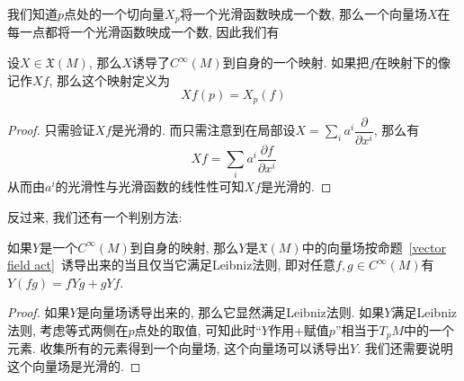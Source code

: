 我们知道$p$点处的一个切向量$X_p$将一个光滑函数映成一个数, 那么一个向量场$X$在每一点都将一个光滑函数映成一个数,
因此我们有
\begin{prop}\label{vector field act}
    设$X\in\mathfrak{X}(M)$, 那么$X$诱导了$C^\infty(M)$到自身的一个映射.
    如果把$f$在映射下的像记作$Xf$, 那么这个映射定义为
    \[Xf(p)=X_p(f)\]
\end{prop}
\begin{proof}
    只需验证$Xf$是光滑的.
    而只需注意到在局部设$X=\sum_{i}a^i\dfrac{\partial}{\partial x^i}$, 那么有
    \[Xf=\sum_{i}a^i\frac{\partial f}{\partial x^i}\]
    从而由$a^i$的光滑性与光滑函数的线性性可知$Xf$是光滑的.
\end{proof}
反过来, 我们还有一个判别方法:
\begin{prop}
    如果$Y$是一个$C^\infty(M)$到自身的映射, 那么$Y$是$\mathfrak{X}(M)$中的向量场按命题~\ref{vector field act}~诱导出来的当且仅当它满足Leibniz法则, 即对任意$f,g\in C^\infty(M)$有$Y(fg)=fYg+gYf$.
\end{prop}
\begin{proof}
    如果$Y$是向量场诱导出来的, 那么它显然满足Leibniz法则.
    如果$Y$满足Leibniz法则, 考虑等式两侧在$p$点处的取值, 可知此时``$Y$作用+赋值$p$''相当于$T_pM$中的一个元素.
    收集所有的元素得到一个向量场, 这个向量场可以诱导出$Y$.
    我们还需要说明这个向量场是光滑的.%
\end{proof}